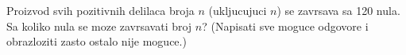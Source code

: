 \problem
Proizvod svih pozitivnih delilaca broja $n$ (ukljucujuci $n$) se zavrsava sa 120 nula.
Sa koliko nula se moze zavrsavati broj $n$?
(Napisati sve moguce odgovore i obrazloziti zasto ostalo nije moguce.)
\solution
\endproblem
